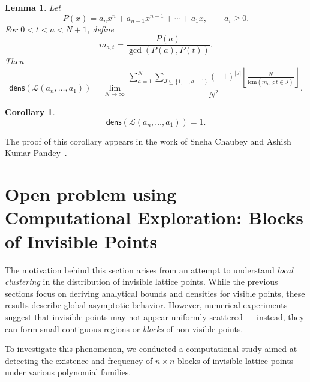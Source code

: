 \documentclass[12pt, reqno]{amsart}
\newtheorem{lemma}[theorem]{Lemma}
\newtheorem{corollary}[theorem]{Corollary}
\theoremstyle{definition}
\theoremstyle{remark}
\numberwithin{equation}{section}
\begin{document}
\begin{lemma}
    
Let  
\[
P(x)=a_nx^n+a_{n-1}x^{n-1}+\cdots+a_1x,\qquad a_i\ge0.
\]
For \(0<t<a<N+1\), define
\[
m_{a,t}=\frac{P(a)}{\gcd(P(a),P(t))}.
\]
Then
\[
\mathsf{dens}(\mathcal{L}(a_n,\dots,a_1))
=
\lim_{N\to\infty}
\frac{
\sum_{a=1}^{N}
\sum_{J\subseteq\{1,\dots,a-1\}}
(-1)^{|J|}
\left\lfloor
\frac{N}{\mathrm{lcm}(m_{a,t}:t\in J)}
\right\rfloor
}{N^2}.
\]
\end{lemma}

\begin{corollary}
\[
\mathsf{dens}(\mathcal{L}(a_n,\dots,a_1))=1.
\]
\end{corollary}
The proof of this corollary appears in the work of Sneha Chaubey and Ashish Kumar Pandey~\cite{Sneha}.

\section{Open problem using Computational Exploration: Blocks of Invisible Points}

The motivation behind this section arises from an attempt to understand 
\emph{local clustering} in the distribution of invisible lattice points. 
While the previous sections focus on deriving analytical bounds and densities 
for visible points, these results describe global asymptotic behavior. 
However, numerical experiments suggest that invisible points may not appear 
uniformly scattered — instead, they can form small contiguous regions or 
\emph{blocks} of non-visible points. 

To investigate this phenomenon, we conducted a computational study aimed at 
detecting the existence and frequency of $n\times n$ blocks of invisible 
lattice points under various polynomial families.\\
\end{document}
